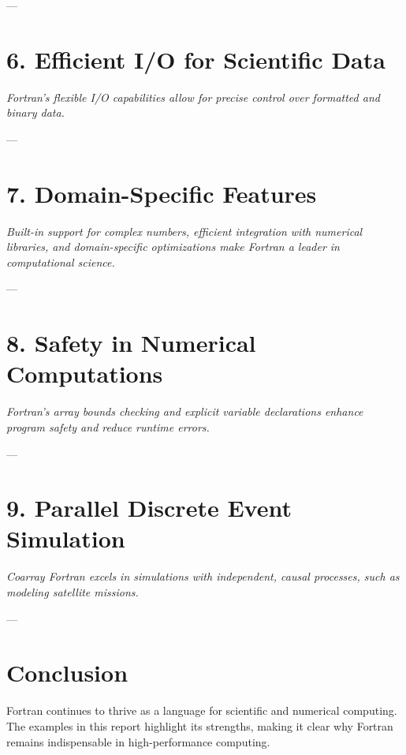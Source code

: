 \documentclass[a4paper,11pt]{article}
\begin{document}
---

\section{6. Efficient I/O for Scientific Data}
\textit{Fortran’s flexible I/O capabilities allow for precise control over formatted and binary data.}

---

\section{7. Domain-Specific Features}
\textit{Built-in support for complex numbers, efficient integration with numerical libraries, and domain-specific optimizations make Fortran a leader in computational science.}

---

\section{8. Safety in Numerical Computations}
\textit{Fortran’s array bounds checking and explicit variable declarations enhance program safety and reduce runtime errors.}

---

\section{9. Parallel Discrete Event Simulation}
\textit{Coarray Fortran excels in simulations with independent, causal processes, such as modeling satellite missions.}

---

\section{Conclusion}
Fortran continues to thrive as a language for scientific and numerical computing. The examples in this report highlight its strengths, making it clear why Fortran remains indispensable in high-performance computing.
\end{document}
